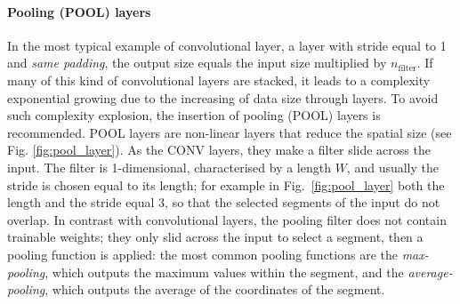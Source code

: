 \paragraph*{Pooling (POOL) layers} 
In the most typical example of convolutional layer, \ie a layer with stride equal to 1 and \emph{same padding}, the output size equals the input size multiplied by $n_{\text{filter}}$. If many of this kind of convolutional layers are stacked, it leads to a complexity exponential growing due to the increasing of data size through layers. To avoid such complexity explosion, the insertion of pooling (POOL) layers is recommended.  POOL layers 
are non-linear layers that reduce the spatial size (see Fig. \ref{fig:pool_layer}). As the CONV layers, they make a filter slide across the input. The filter is 1-dimensional, characterised by a length $W$, and usually the stride is chosen equal to its length; for example in Fig.~\ref{fig:pool_layer} both the length and the stride equal 3, so that the selected segments of the input do not overlap. In contrast with convolutional layers, the pooling filter does not contain trainable weights; they only slid across the input to select a segment, then a pooling function is applied: the most common pooling functions are the \emph{max-pooling}, which outputs the maximum values within the segment, and the \emph{average-pooling}, which outputs the average of the coordinates of the segment. 


%

